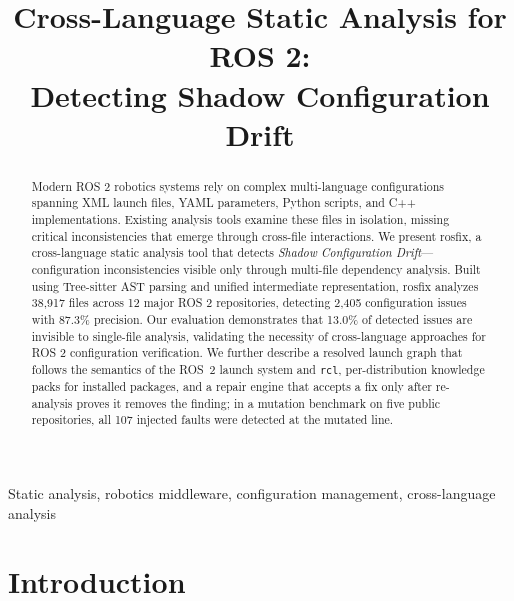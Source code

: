 \documentclass[conference]{IEEEtran}
\newcommand{\code}[1]{\texttt{#1}}
\begin{document}
\title{Cross-Language Static Analysis for ROS 2:\\Detecting Shadow Configuration Drift}

\author{
}

\maketitle

\begin{abstract}
Modern ROS 2 robotics systems rely on complex multi-language configurations spanning XML
launch files, YAML parameters, Python scripts, and C++ implementations. Existing analysis tools
examine these files in isolation, missing critical inconsistencies that emerge through cross-file
interactions. We present rosfix, a cross-language static analysis tool that detects
\emph{Shadow Configuration Drift}---configuration inconsistencies visible only through
multi-file dependency analysis. Built using Tree-sitter AST parsing and unified intermediate
representation, rosfix analyzes 38,917 files across 12 major ROS 2 repositories, detecting 2,405
configuration issues with 87.3\% precision. Our evaluation demonstrates that 13.0\% of detected
issues are invisible to single-file analysis, validating the necessity of cross-language
approaches for ROS 2 configuration verification.
We further describe a resolved launch graph that follows the semantics of the ROS~2 launch
system and \code{rcl}, per-distribution knowledge packs for installed packages, and a repair
engine that accepts a fix only after re-analysis proves it removes the finding; in a mutation
benchmark on five public repositories, all 107 injected faults were detected at the mutated line.
\end{abstract}

\begin{IEEEkeywords}
Static analysis, robotics middleware, configuration management, cross-language analysis
\end{IEEEkeywords}

\section{Introduction}
\end{document}
